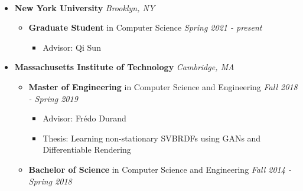\documentclass[10pt]{article}
\author{Budmonde Duinkharjav}
\begin{document}
\maketitle

\newenvironment{area}[1]{{\large\bfseries #1}\\\separator}{\vspace{0.25em}}

\begin{area}{Education}
\begin{itemize}
    \item
        \textbf{New York University} \hfill \emph{Brooklyn, NY}
        \begin{itemize}
            \item
                \textbf{Graduate Student} in Computer Science \hfill \emph{Spring 2021 - present}
                \begin{itemize}
                    \item Advisor: Qi Sun
                \end{itemize}
        \end{itemize}
    \item
        \textbf{Massachusetts Institute of Technology} \hfill \emph{Cambridge, MA}
        \begin{itemize}
            \item
                \textbf{Master of Engineering} in Computer Science and Engineering \hfill \emph{Fall 2018 - Spring 2019}
                \begin{itemize}
                    \item Advisor: Frédo Durand
                    \item Thesis: Learning non-stationary SVBRDFs using GANs and Differentiable Rendering
                \end{itemize}
            \item 
                \textbf{Bachelor of Science} in Computer Science and Engineering \hfill \emph{Fall 2014 - Spring 2018}
        \end{itemize}
\end{itemize}
\end{area}
\end{document}
